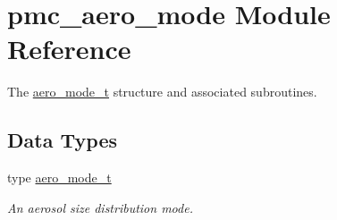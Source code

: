 \hypertarget{namespacepmc__aero__mode}{}\section{pmc\+\_\+aero\+\_\+mode Module Reference}
\label{namespacepmc__aero__mode}


The \mbox{\hyperlink{structpmc__aero__mode_1_1aero__mode__t}{aero\+\_\+mode\+\_\+t}} structure and associated subroutines.  


\subsection*{Data Types}
\begin{DoxyCompactItemize}
\item 
type \mbox{\hyperlink{structpmc__aero__mode_1_1aero__mode__t}{aero\+\_\+mode\+\_\+t}}
\begin{DoxyCompactList}\small\item\em An aerosol size distribution mode. \end{DoxyCompactList}\end{DoxyCompactItemize}
